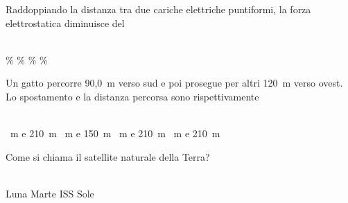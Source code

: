 \documentclass[a4paper,11pt]{exam}
\begin{document}
\begin{questions}
    
\question Raddoppiando la distanza tra due cariche elettriche puntiformi, la forza elettrostatica diminuisce del\\\
\begin{oneparchoices}
  \%
  \%
  \%
  \%
\end{oneparchoices}

    
\question Un gatto percorre 90,0~m verso sud e poi prosegue per altri 120~m verso ovest. Lo spostamento e la distanza percorsa sono rispettivamente\\\
\begin{oneparchoices}
  ~m e 210~m
  \choice 210~m e 150~m
  ~m e 210~m
  ~m e 210~m
\end{oneparchoices}

    
\question Come si chiama il satellite naturale della Terra?\\\
\begin{oneparchoices}
  \choice Luna
  \choice Marte
  \choice ISS
  \choice Sole
\end{oneparchoices}

    
\end{questions}

    
    \newpage
    
    
\end{document}

